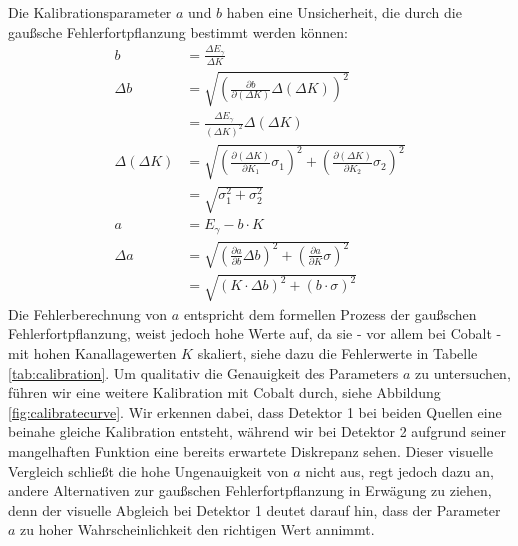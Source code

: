 \documentclass[%
aps,
onecolumn,
11pt,
tightenlines,
nofootinbib,
superscriptaddress,
floatfix,
prd,
]{revtex4-2}
\begin{document}
Die Kalibrationsparameter $a$ und $b$ haben eine Unsicherheit, die durch die gaußsche Fehlerfortpflanzung bestimmt werden können: 
\begin{align}
    b                &= \frac{\Delta E_\gamma}{\Delta K} \\
    \Delta b         &=  \sqrt{ \left ( \frac{\partial b}{\partial (\Delta K)}\Delta(\Delta K) \right )^2 } \\
                     &= \frac{\Delta E_{\gamma}}{(\Delta K)^2}\Delta (\Delta K) \\
    \Delta(\Delta K) &= \sqrt{ \left( \frac{\partial(\Delta K)}{\partial K_1} \sigma_1 \right)^2 + 
        \left( \frac{\partial(\Delta K)}{\partial K_2} \sigma_2 \right)^2} \\
                     &= \sqrt{\sigma_1^2 + \sigma_2^2}\\
    a                &= E_{\gamma} - b \cdot K \\
    \Delta a         &= \sqrt{ \left( \frac{\partial a}{\partial b} \Delta b \right)^2 + 
        \left( \frac{\partial a}{\partial K} \sigma \right)^2  } \\
                     &= \sqrt{ \left( K \cdot \Delta b \right)^2 + \left( b \cdot \sigma \right)^2 }
\end{align}
Die Fehlerberechnung von $a$ entspricht dem formellen Prozess der gaußschen Fehlerfortpflanzung, weist jedoch hohe Werte auf, da sie - vor allem bei Cobalt - mit hohen Kanallagewerten $K$ skaliert, siehe dazu die Fehlerwerte in Tabelle \ref{tab:calibration}. Um qualitativ die Genauigkeit des Parameters $a$ zu untersuchen, führen wir eine weitere Kalibration mit Cobalt durch, siehe Abbildung \ref{fig:calibratecurve}. Wir erkennen dabei, dass Detektor 1 bei beiden Quellen eine beinahe gleiche Kalibration entsteht, während wir bei Detektor 2 aufgrund seiner mangelhaften Funktion eine bereits erwartete Diskrepanz sehen. Dieser visuelle Vergleich schließt die hohe Ungenauigkeit von $a$ nicht aus, regt jedoch dazu an, andere Alternativen zur gaußschen Fehlerfortpflanzung in Erwägung zu ziehen, denn der visuelle Abgleich bei Detektor 1 deutet darauf hin, dass der Parameter $a$ zu hoher Wahrscheinlichkeit den richtigen Wert annimmt.
\end{document}
